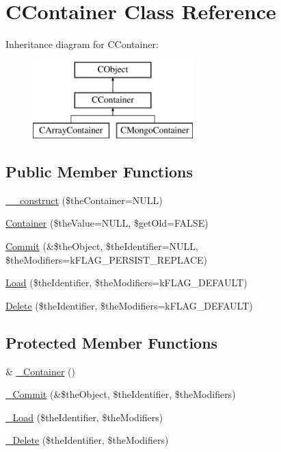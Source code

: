 \hypertarget{class_c_container}{\section{C\-Container Class Reference}
\label{class_c_container}
}
Inheritance diagram for C\-Container\-:\begin{figure}[H]
\begin{center}
\leavevmode
\includegraphics[height=3.000000cm]{class_c_container}
\end{center}
\end{figure}
\subsection*{Public Member Functions}
\begin{DoxyCompactItemize}
\item 
\hyperlink{class_c_container_af2fc42b4d7b5f71e0f127c941440b1aa}{\-\_\-\-\_\-construct} (\$the\-Container=N\-U\-L\-L)
\item 
\hyperlink{class_c_container_a7d10fa70dfa381cb95e66c265e2ca113}{Container} (\$the\-Value=N\-U\-L\-L, \$get\-Old=F\-A\-L\-S\-E)
\item 
\hyperlink{class_c_container_a4847dc676d1f7704e75f8981e927508a}{Commit} (\&\$the\-Object, \$the\-Identifier=N\-U\-L\-L, \$the\-Modifiers=k\-F\-L\-A\-G\-\_\-\-P\-E\-R\-S\-I\-S\-T\-\_\-\-R\-E\-P\-L\-A\-C\-E)
\item 
\hyperlink{class_c_container_a48db96aa6bbf15d0bfc15725616b7154}{Load} (\$the\-Identifier, \$the\-Modifiers=k\-F\-L\-A\-G\-\_\-\-D\-E\-F\-A\-U\-L\-T)
\item 
\hyperlink{class_c_container_aa91ec2f4624a2ebfb74668f274139329}{Delete} (\$the\-Identifier, \$the\-Modifiers=k\-F\-L\-A\-G\-\_\-\-D\-E\-F\-A\-U\-L\-T)
\end{DoxyCompactItemize}
\subsection*{Protected Member Functions}
\begin{DoxyCompactItemize}
\item 
\& \hyperlink{class_c_container_a4794d326f4ffd3c2b8afd2e0460604ff}{\-\_\-\-Container} ()
\item 
\hyperlink{class_c_container_a95c13ac30a01bd5ee684fe1baf0d8d43}{\-\_\-\-Commit} (\&\$the\-Object, \$the\-Identifier, \$the\-Modifiers)
\item 
\hyperlink{class_c_container_a93d34640379c1debc9542609bf4b34e9}{\-\_\-\-Load} (\$the\-Identifier, \$the\-Modifiers)
\item 
\hyperlink{class_c_container_adb859efe2ce642d29d3bff48a806789d}{\-\_\-\-Delete} (\$the\-Identifier, \$the\-Modifiers)
\end{DoxyCompactItemize}
